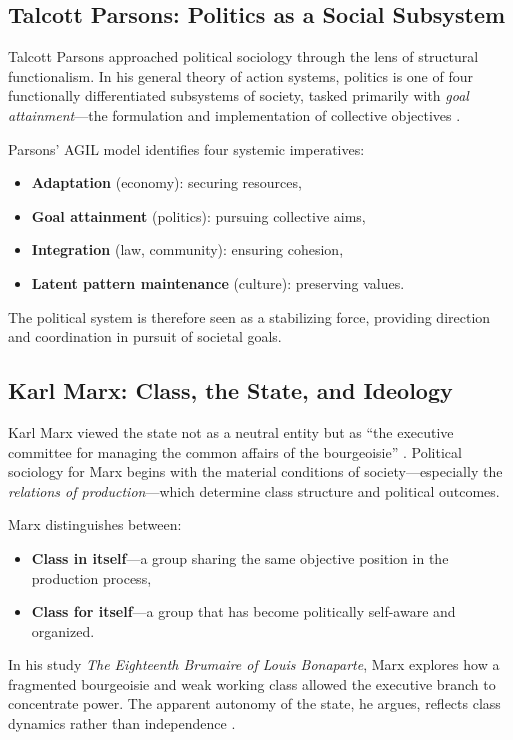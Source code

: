 \documentclass[12pt]{article}
\begin{document}
\subsection*{Talcott Parsons: Politics as a Social Subsystem}

Talcott Parsons approached political sociology through the lens of structural functionalism. In his general theory of action systems, politics is one of four functionally differentiated subsystems of society, tasked primarily with \textit{goal attainment}—the formulation and implementation of collective objectives \parencite{parsons1959}.

Parsons’ AGIL model identifies four systemic imperatives:
\begin{itemize}
    \item \textbf{Adaptation} (economy): securing resources,
    \item \textbf{Goal attainment} (politics): pursuing collective aims,
    \item \textbf{Integration} (law, community): ensuring cohesion,
    \item \textbf{Latent pattern maintenance} (culture): preserving values.
\end{itemize}
The political system is therefore seen as a stabilizing force, providing direction and coordination in pursuit of societal goals.

\subsection*{Karl Marx: Class, the State, and Ideology}

Karl Marx viewed the state not as a neutral entity but as “the executive committee for managing the common affairs of the bourgeoisie” \parencite{marx1869}. Political sociology for Marx begins with the material conditions of society—especially the \textit{relations of production}—which determine class structure and political outcomes.

Marx distinguishes between:
\begin{itemize}
    \item \textbf{Class in itself}—a group sharing the same objective position in the production process,
    \item \textbf{Class for itself}—a group that has become politically self-aware and organized.
\end{itemize}
In his study \textit{The Eighteenth Brumaire of Louis Bonaparte}, Marx explores how a fragmented bourgeoisie and weak working class allowed the executive branch to concentrate power. The apparent autonomy of the state, he argues, reflects class dynamics rather than independence \parencite{poulantzas1976}.
\end{document}
